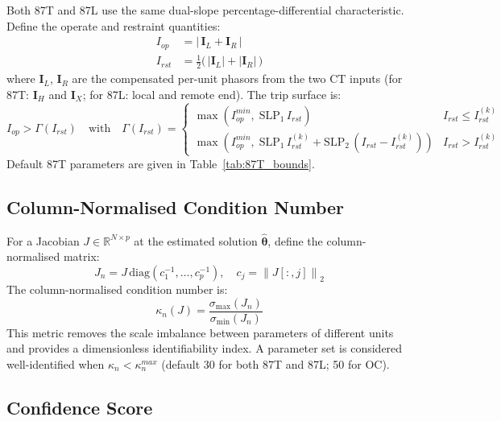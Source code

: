 \documentclass[12pt,a4paper]{article}
\newcommand{\norm}[1]{\left\lVert#1\right\rVert}
\newcommand{\kappan}{\kappa_n}
\newcommand{\hattheta}{\hat{\boldsymbol{\theta}}}
\newcommand{\Iop}{I_{op}}
\newcommand{\Irst}{I_{rst}}
\begin{document}
Both 87T and 87L use the same dual-slope percentage-differential
characteristic.  Define the operate and restraint quantities:
\begin{align}
  \Iop  &= \bigl|\,\bm{I}_{L} + \bm{I}_{R}\,\bigr|
  \label{eq:Iop}\\
  \Irst &= \tfrac{1}{2}\bigl(\,|\bm{I}_{L}| + |\bm{I}_{R}|\,\bigr)
  \label{eq:Irst}
\end{align}
where $\bm{I}_{L}$, $\bm{I}_{R}$ are the compensated per-unit phasors from
the two CT inputs (for 87T: $\bm{I}_H$ and $\bm{I}_X$; for 87L: local and
remote end).  The trip surface is:
\begin{equation}
  \Iop > \Gamma(\Irst)
  \quad\text{with}\quad
  \Gamma(\Irst) =
  \begin{cases}
    \max\!\left(\Iop^{min},\; \mathrm{SLP}_1\,\Irst\right)
       & \Irst \le \Irst^{(k)}\\
    \max\!\left(\Iop^{min},\; \mathrm{SLP}_1\,\Irst^{(k)}
        + \mathrm{SLP}_2\,(\Irst - \Irst^{(k)})\right)
       & \Irst > \Irst^{(k)}
  \end{cases}
  \label{eq:dual_slope}
\end{equation}
Default 87T parameters are given in Table~\ref{tab:87T_bounds}.

\subsection{Column-Normalised Condition Number}
\label{sec:kappan}

For a Jacobian $J \in \mathbb{R}^{N \times p}$ at the estimated solution
$\hattheta$, define the column-normalised matrix:
\begin{equation}
  J_n = J \,\mathrm{diag}(c_1^{-1},\ldots,c_p^{-1}),
  \quad c_j = \norm{J[:,j]}_2
  \label{eq:Jn}
\end{equation}
The column-normalised condition number is:
\begin{equation}
  \kappan(J) = \frac{\sigma_{\max}(J_n)}{\sigma_{\min}(J_n)}
  \label{eq:kappan}
\end{equation}
This metric removes the scale imbalance between parameters of different units
and provides a dimensionless identifiability index.  A parameter set is
considered well-identified when $\kappan < \kappan^{max}$ (default 30 for
both 87T and 87L; 50 for OC).

\subsection{Confidence Score}
\label{sec:confidence}
\end{document}
